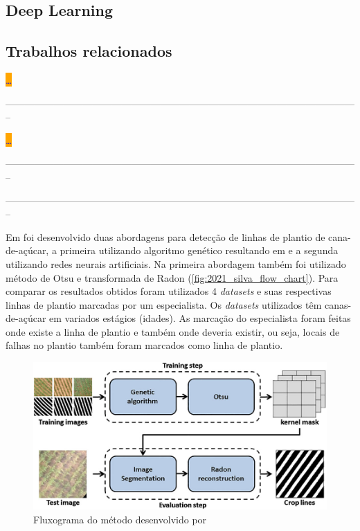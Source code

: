 \documentclass[12pt, a4paper, english, brazil]{article}
\newcommand{\dotsBlue}{\colorbox{orange}{\textcolor{blue}{\dots}}}
\newcommand{\linePage}{--------------------------------------------------------------------------------------------------------------}
\begin{document}
\subsection{Deep Learning}

\subsection{Trabalhos relacionados}

\cite{Souza_2017} \dotsBlue

\linePage

\cite{Souza_2018} \dotsBlue

\linePage

\cite{Bah_2020}

\linePage

Em  foi desenvolvido duas abordagens para detecção de linhas de plantio de cana-de-açúcar, a primeira utilizando algoritmo genético resultando em  e a segunda utilizando redes neurais artificiais. Na primeira abordagem também foi utilizado método de Otsu e transformada de Radon (\autoref{fig:2021_silva_flow_chart}). Para comparar os resultados obtidos foram utilizados 4 \textit{datasets} e suas respectivas linhas de plantio marcadas por um especialista. Os \textit{datasets} utilizados têm canas-de-açúcar em variados estágios (idades). As marcação do especialista foram feitas onde existe a linha de plantio e também onde deveria existir, ou seja, locais de falhas no plantio também foram marcados como linha de plantio.

\begin{figure}[htbp]
    \centering
    \includegraphics[width=0.6\textheight]{img/2021_Silva_flow_chart.png}
    \caption{Fluxograma do método desenvolvido por  }
    \label{fig:2021_silva_flow_chart}
\end{figure}
\end{document}
